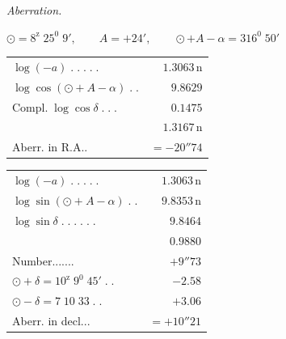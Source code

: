 \begin{center}
\textit{Aberration.}\par\medskip
$\odot=8^{\mathrm z}\;25^0\;9',\qquad A=+24',\qquad \odot+A-\alpha=316^0\;50'$
\par\medskip
\begin{minipage}[t]{.48\textwidth}\centering\footnotesize
\begin{tabular}[t]{@{}lr@{}}
$\log(-a)\;.\;.\;.\;.\;.$&$1.3063\,\mathrm n$\\
$\log\cos(\odot+A-\alpha)\;.\;.$&$9.8629$\\
$\text{Compl.}\;\log\cos\delta\;.\;.\;.$&$0.1475$\\\hline
&$1.3167\,\mathrm n$\\
Aberr. in R.A.\;.&$=-20''74$
\end{tabular}
\end{minipage}\hfill
\begin{minipage}[t]{.49\textwidth}\centering\footnotesize
\begin{tabular}[t]{@{}lr@{}}
$\log(-a)\;.\;.\;.\;.\;.$&$1.3063\,\mathrm n$\\
$\log\sin(\odot+A-\alpha)\;.\;.$&$9.8353\,\mathrm n$\\
$\log\sin\delta\;.\;.\;.\;.\;.\;.$&$9.8464$\\\hline
&$0.9880$\\
Number\;.\;.\;.\;.\;.\;.\;.&$+9''73$\\
$\odot+\delta=10^{\mathrm z}\;9^0\;45'\;.\;.$&$-2.58$\\
$\odot-\delta=7\;10\;33\;.\;.$&$+3.06$\\\hline
Aberr. in decl.\;.\;.&$=+10''21$
\end{tabular}
\end{minipage}
\end{center}
\clearpage{}
